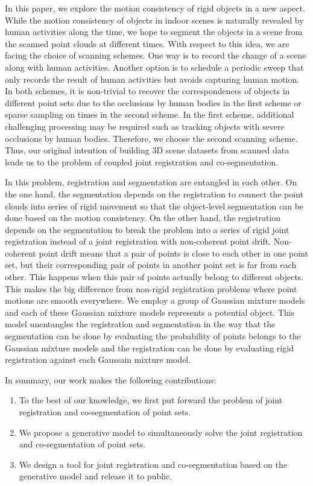 In this paper, we explore the motion consistency of rigid objects in a new aspect.
While the motion consistency of objects in indoor scenes is naturally revealed by human activities along the time, we hope to segment the objects in a scene from the scanned point clouds at different times. With respect to this idea, we are facing the choice of scanning schemes. One way is to record the change of a scene along with human activities. Another option is to schedule a periodic sweep that only records the result of human activities but avoids capturing human motion. 
In both schemes, it is non-trivial to recover the correspondences of objects in different point sets due to the occlusions by human bodies in the first scheme or sparse sampling on times in the second scheme. In the first scheme, additional challenging processing may be required such as tracking objects with severe occlusions by human bodies. Therefore, we choose the second scanning scheme. 
Thus, our original intention of building 3D scene datasets from scanned data leads us to the problem of coupled joint registration and co-segmentation.

In this problem, registration and segmentation are entangled in each other. On the one hand, the segmentation depends on the registration to connect the point clouds into series of rigid movement so that the object-level segmentation can be done based on the motion consistency. On the other hand, the registration depends on the segmentation to break the problem into a series of rigid joint registration instead of a joint registration with non-coherent point drift. 
Non-coherent point drift means that a pair of points is close to each other in one point set, but their corresponding pair of points in another point set is far from each other. 
This happens when this pair of points actually belong to different objects.
%
This makes the big difference from non-rigid registration problems where point motions are smooth everywhere.
%
We employ a group of Gaussian mixture models and each of these Gaussian mixture models represents a potential object. 
This model unentangles the registration and segmentation in the way that the segmentation can be done by evaluating the probability of points belongs to the Gaussian mixture models and the registration can be done by evaluating rigid registration against each Gaussain mixture model.

In summary, our work makes the following contributions: 
\begin{enumerate}
	\item To the best of our knowledge, we first put forward the problem of joint registration and co-segmentation of point sets.
	
	\item We propose a generative model to simultaneously solve the joint registration and co-segmentation of point sets.
	
	\item We design a tool for joint registration and co-segmentation based on the generative model and release it to public. 
\end{enumerate}